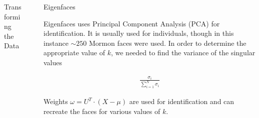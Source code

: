 \documentclass[final]{beamer}
\newlength{\sepwid}
\newlength{\onecolwid}
\begin{document}
\begin{frame}[t]
\begin{columns}[t]
\begin{column}{\onecolwid}
\begin{block}{Transforming the Data}
\end{block}


\end{column} %

\begin{column}{\sepwid}\end{column} %

\begin{column}{\onecolwid} %


\begin{block}{Eigenfaces}


Eigenfaces uses Principal Component Analysis (PCA) for identification. It is usually used for 
individuals, though in this instance $\sim 250$ Mormon faces were used. In order to determine
the appropriate value of $k$, we needed to find the variance of the singular values

\vspace{-1em}
\begin{align*}
  \frac{\sigma_{i}}{\sum_{i=1}^{N}\sigma_{i}}
\end{align*}

Weights $\omega = U^{T}\cdot (X - \mu)$ are used for identification and can recreate the 
faces for various values of $k$.


\end{block}
\end{column}
\end{columns}
\end{frame}
\end{document}

